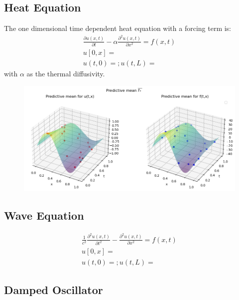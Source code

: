 \documentclass{article}
\begin{document}
\subsection{Heat Equation}
The one dimensional time dependent heat equation with a forcing term is: 
\begin{equation}
    \begin{aligned}
    \frac{\partial u(x,t)}{\partial t} - \alpha \frac{\partial^2 u(x,t)}{\partial x^2} = f(x,t)\\
    u[0,x] =\\
    u(t,0) = ; u(t,L) = 
\end{aligned}
\end{equation}
with $\alpha$ as the thermal diffusivity.
\begin{figure}
    \centering
    \includegraphics[width=1\textwidth]{../PI_GP_regressor/plots/heat_eq/predictive_mean.png}
    \caption{}
    \label{fig:heat_equation}
\end{figure}


\subsection{Wave Equation}
\begin{equation}
    \begin{aligned}
    \frac{1}{c^2} \frac{\partial^2 u(x,t)}{\partial t^2} - \frac{\partial^2 u(x,t)}{\partial x^2} = f(x,t)\\
    u[0,x] =\\
    u(t,0) = ; u(t,L) = 
    \end{aligned}
\end{equation}
\subsection{Damped Oscillator}






\end{document}
